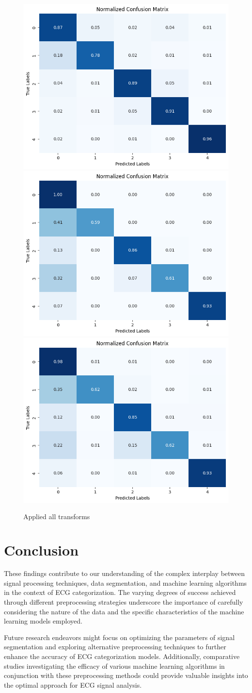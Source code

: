 \documentclass[runningheads]{llncs}
\begin{document}
\begin{figure}
    \centering
    \includegraphics[width=0.4\linewidth]{figs/svc_proc_orig.png}
    \includegraphics[width=0.4\linewidth]{figs/random_for_proc_orig.png}
    \includegraphics[width=0.4\linewidth]{figs/d_tree_proc_orig.png}
    \caption{Applied all transforms}
    \label{fig:mixed_data}
\end{figure}


\section{Conclusion}

These findings contribute to our understanding of the complex interplay between signal processing techniques, data segmentation, and machine learning algorithms in the context of ECG categorization. The varying degrees of success achieved through different preprocessing strategies underscore the importance of carefully considering the nature of the data and the specific characteristics of the machine learning models employed.

Future research endeavors might focus on optimizing the parameters of signal segmentation and exploring alternative preprocessing techniques to further enhance the accuracy of ECG categorization models. Additionally, comparative studies investigating the efficacy of various machine learning algorithms in conjunction with these preprocessing methods could provide valuable insights into the optimal approach for ECG signal analysis.


%
%
%
% 
% 




\end{document}
